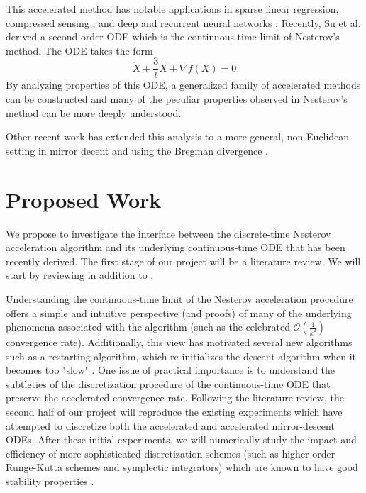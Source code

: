 \documentclass{article}
\begin{document}
This accelerated method has notable applications in sparse linear regression\cite{beck2009fast}\cite{qin2012structured}, compressed sensing \cite{becker2011nesta}, and deep and recurrent neural networks \cite{sutskever2013importance}. Recently, Su et al.\cite{su2014differential} derived a second order ODE which is the continuous time limit of Nesterov's method. The ODE takes the form
\[ \ddot{X} + \frac{3}{t} \dot{X} + \nabla f(X) = 0 \]
By analyzing properties of this ODE, a generalized family of accelerated methods can be constructed and many of the peculiar properties observed in Nesterov's method can be more deeply understood. 

Other recent work has extended this analysis to a more general, non-Euclidean setting in mirror decent and using the Bregman divergence \cite{wibisono2016variational, krichene2015accelerated}. 

\section{Proposed Work}
We propose to investigate the interface between the discrete-time Nesterov acceleration algorithm and its underlying continuous-time ODE that has been recently derived. The first stage of our project will be a literature review. We will start by reviewing \cite{su2014differential, wibisono2016variational, krichene2015accelerated} in addition to \cite{DBLP:journals/ftml/Bubeck15}. 

Understanding the continuous-time limit of the Nesterov acceleration procedure offers a simple and intuitive perspective (and proofs) of many of the underlying phenomena associated with the algorithm (such as the celebrated $\mathcal{O}(\frac{1}{k^2})$ convergence rate). Additionally, this view has motivated several new algorithms such as a restarting algorithm, which re-initializes the descent algorithm when it becomes too "slow" \cite{su2014differential}. 
One issue of practical importance is to understand the subtleties of the discretization procedure of the continuous-time ODE that preserve the accelerated convergence rate. Following the literature review, the second half of our project will reproduce the existing experiments which have attempted to discretize both the accelerated and accelerated mirror-descent ODEs. After these initial experiments, we will numerically study the impact and efficiency of more sophisticated discretization schemes (such as higher-order Runge-Kutta schemes and symplectic integrators) which are known to have good stability properties \cite{hairer2006geometric}. 




\end{document}
